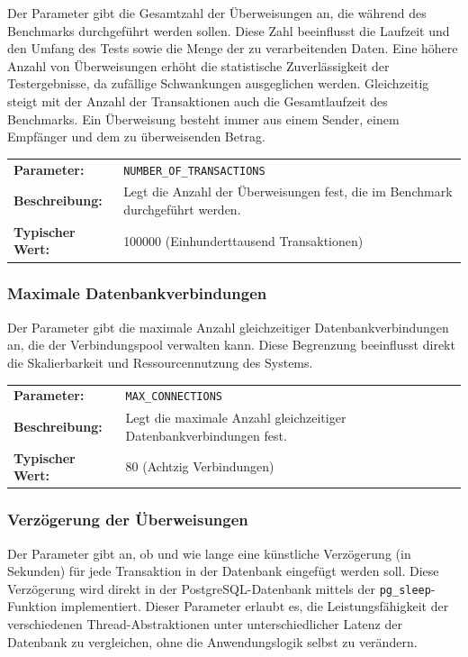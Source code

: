 \documentclass[fontsize=12pt,paper=a4,twoside=semi,parskip=half-,headsepline,headinclude]{scrreprt}
\begin{document}
Der Parameter gibt die Gesamtzahl der Überweisungen an, die während des Benchmarks durchgeführt werden sollen. Diese Zahl beeinflusst die Laufzeit und den Umfang des Tests sowie die Menge der zu verarbeitenden Daten. Eine höhere Anzahl von Überweisungen erhöht die statistische Zuverlässigkeit der Testergebnisse, da zufällige Schwankungen ausgeglichen werden. Gleichzeitig steigt mit der Anzahl der Transaktionen auch die Gesamtlaufzeit des Benchmarks. Ein Überweisung besteht immer aus einem Sender, einem Empfänger und dem zu überweisenden Betrag. 

\begin{tabularx}{\textwidth}{@{}lX@{}}
	\textbf{Parameter:} & \texttt{NUMBER\_OF\_TRANSACTIONS} \\
	\textbf{Beschreibung:} & Legt die Anzahl der Überweisungen fest, die im Benchmark durchgeführt werden. \\
	\textbf{Typischer Wert:} & 100000 (Einhunderttausend Transaktionen)
\end{tabularx}

\subsubsection{Maximale Datenbankverbindungen}

Der Parameter gibt die maximale Anzahl gleichzeitiger Datenbankverbindungen an, die der Verbindungspool verwalten kann. Diese Begrenzung beeinflusst direkt die Skalierbarkeit und Ressourcennutzung des Systems.

\begin{tabularx}{\textwidth}{@{}lX@{}}
	\textbf{Parameter:} & \texttt{MAX\_CONNECTIONS} \\
	\textbf{Beschreibung:} & Legt die maximale Anzahl gleichzeitiger Datenbankverbindungen fest. \\
	\textbf{Typischer Wert:} & 80 (Achtzig Verbindungen)
\end{tabularx}

\subsubsection{Verzögerung der Überweisungen}

Der Parameter gibt an, ob und wie lange eine künstliche Verzögerung (in Sekunden) für jede Transaktion in der Datenbank eingefügt werden soll. Diese Verzögerung wird direkt in der PostgreSQL-Datenbank mittels der \texttt{pg\_sleep}-Funktion implementiert. Dieser Parameter erlaubt es, die Leistungsfähigkeit der verschiedenen Thread-Abstraktionen unter unterschiedlicher Latenz der Datenbank zu vergleichen, ohne die Anwendungslogik selbst zu verändern.
\end{document}
